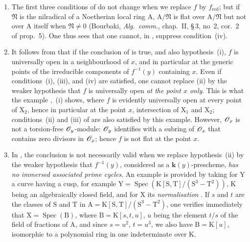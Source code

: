 \begin{remarks}[15.2.4]
\label{IV.15.2.4}
\begin{enumerate}[label=(\roman*)]
  \item The first three conditions of  do not change when we replace $f$ by $f_\mathrm{red}$; but if $\mathfrak{N}$ is the nilradical of a Noetherian local ring $\mathrm{A}$, $\mathrm{A}/\mathfrak{N}$ is flat over $\mathrm{A}/\mathfrak{N}$ but not over $\mathrm{A}$ itself when $\mathfrak{N}\neq 0$ (Bourbaki, \emph{Alg.\ comm.}, chap.~II, \S\,3, no~2, cor.~2 of prop.~5).
One thus sees that one cannot, in , suppress condition~(iv).
  \item It follows from  that if the conclusion of  is true, and also hypothesis~(i), $f$ is universally open in a neighbourhood of $x$, and in particular at the generic points of the irreducible components of $f^{-1}(y)$ containing $x$.
Even if conditions~(i), (iii), and (iv) are satisfied, one cannot replace (ii) by the weaker hypothesis that $f$ is universally open \emph{at the point $x$ only}.
This is what the example ,~(i) shows, where $f$ is evidently universally open at every point of $\mathrm{X}_2$, hence in particular at the point $x$, intersection of $\mathrm{X}_1$ and $\mathrm{X}_2$; conditions~(ii) and (iii) of  are also satisfied by this example.
However, $\mathscr{O}_x$ is not a torsion-free $\mathscr{O}_y$-module: $\mathscr{O}_y$ identifies with a subring of $\mathscr{O}_x$ that contains zero divisors in $\mathscr{O}_x$; hence $f$ is not flat at the point $x$.
  \item In , the conclusion is not necessarily valid when we replace hypothesis~(ii) by the weaker hypothesis that $f^{-1}(y)$, considered as a $\mathbf{k}(y)$-prescheme, \emph{has no immersed associated prime cycles}.
An example is provided by taking for $\mathrm{Y}$ a curve having a cusp, for example $\mathrm{Y}=\operatorname{Spec}(\mathrm{K}[\mathrm{S},\mathrm{T}]/(\mathrm{S}^3-\mathrm{T}^2))$, $\mathrm{K}$ being an algebraically closed field, and for $\mathrm{X}$ its \emph{normalisation} .
If $s$ and $t$ are the classes of $\mathrm{S}$ and $\mathrm{T}$ in $\mathrm{A}=\mathrm{K}[\mathrm{S},\mathrm{T}]/(\mathrm{S}^3-\mathrm{T}^2)$, one verifies immediately that $\mathrm{X}=\operatorname{Spec}(\mathrm{B})$, where $\mathrm{B}=\mathrm{K}[s,t,u]$, $u$ being the element $t/s$ of the field of fractions of $\mathrm{A}$, and since $s=u^2$, $t=u^3$, we also have $\mathrm{B}=\mathrm{K}[u]$, isomorphic to a polynomial ring in one indeterminate over $\mathrm{K}$.

\end{enumerate}
\end{remarks}
